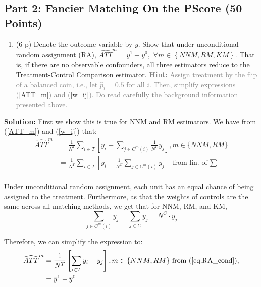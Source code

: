 \documentclass[
]{article}
\providecommand{\tightlist}{%
  \setlength{\itemsep}{0pt}\setlength{\parskip}{0pt}}
\begin{document}
\subsection{Part 2: Fancier Matching On the PScore (50
Points)}\label{part-2-fancier-matching-on-the-pscore-50-points}


\newpage

\begin{enumerate}
\def\labelenumi{\arabic{enumi}.}
\setcounter{enumi}{3}
\tightlist
\item
  (6 p) Denote the outcome variable by \(y\). Show that under
  unconditional random assignment (RA),
  \(\widehat{ATT}^{m}=\overline{y}^{1}-\overline{y}^{0},\)
  \(\forall m\in \left\{ NNM,RM,KM\right\}\). That is, if there are no
  observable confounders, all three estimators reduce to the
  Treatment-Control Comparison estimator.
  \textcolor{gray}{\textbf{Hint:} Assign treatment by the flip of a balanced coin, i.e., let $\widehat{p}_{i}=0.5$ for all $i$. Then, simplify expressions (\ref{ATT_m}) and (\ref{w_ij}). Do read carefully the background information presented above.}
\end{enumerate}

\textbf{Solution:} First we show this is true for NNM and RM estimators.
We have from (\ref{ATT_m}) and (\ref{w_ij}) that: \begin{align*}
    \widehat{ATT}^{m} &= \frac{1}{N^T}\sum_{i \in T} \left[  y_i - \sum_{j \in C^{m}\left( i\right)} \frac{1}{N^C} y_j\right], m \in \{NNM, RM\} \\
                      &= \frac{1}{N^T}\sum_{i \in T}  \left[ y_i - \frac{1}{N^C} \sum_{j \in C^{m}\left( i\right)} y_j \right] \text{ from lin. of $\sum$}\\
  \end{align*}

Under unconditional random assignment, each unit has an equal chance of
being assigned to the treatment. Furthermore, as that the weights of
controls are the same across all matching methods, we get that for NNM,
RM, and KM, \begin{equation}\label{eq:RA_cond}
    \sum_{j \in C^{m}\left( i\right)} y_j = \sum_{j \in C} y_j = N^C \cdot y_j 
  \end{equation}

Therefore, we can simplify the expression to: \begin{align*}
    \widehat{ATT}^{m} &= \frac{1}{N^T} \left[ \sum_{i \in T} y_i - y_j \right], m \in \{NNM, RM\} \text{ from (\ref{eq:RA_cond}),} \\
                      &= \overline{y}^{1} - \overline{y}^{0}
  \end{align*}
\end{document}
